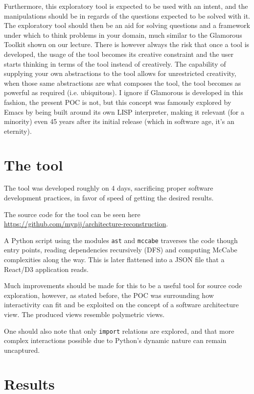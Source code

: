 \documentclass[a4paper,11pt]{article}
\begin{document}
Furthermore, this exploratory tool is expected to be used with an intent, and the manipulations should be in regards of the questions expected to be solved with it. The exploratory tool should then be an aid for solving questions and a framework under which to think problems in your domain, much similar to the Glamorous Toolkit shown \cite{glamour} on our lecture. There is however always the risk that once a tool is developed, the usage of the tool becomes its creative constraint and the user starts thinking in terms of the tool instead of creatively. The capability of supplying your own abstractions to the tool allows for unrestricted creativity, when those same abstractions are what composes the tool, the tool becomes as powerful as required (i.e. ubiquitous). I ignore if Glamorous is developed in this fashion, the present POC is not, but this concept was famously explored by Emacs by being built around its own LISP interpreter, making it relevant (for a minority) even 45 years after its initial release (which in software age, it's an eternity).


\section{The tool}
\label{sec:orgf5f422f}
The tool was developed roughly on 4 days, sacrificing proper software development practices, in favor of speed of getting the desired results. 

The source code for the tool can be seen here \href{https://github.com/mynjj/architecture-reconstruction}{https://github.com/mynjj/architecture-reconstruction}.

A Python script using the modules \texttt{ast} and \texttt{mccabe} traverses the code though entry points, reading dependencies recursively (DFS) and computing McCabe complexities along the way. This is later flattened into a JSON file that a React/D3 application reads.

Much improvements should be made for this to be a useful tool for source code exploration, however, as stated before, the POC was surrounding how interactivity can fit and be exploited on the concept of a software architecture view. The produced views resemble polymetric views.

One should also note that only \texttt{import} relations are explored, and that more complex interactions possible due to Python's dynamic nature can remain uncaptured.

\section{Results}
\label{sec:org4eb9011}
\end{document}
